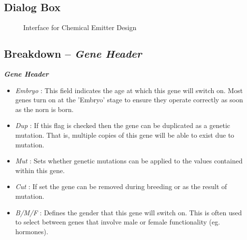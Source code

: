 \documentclass[11pt,twoside,a4paper]{article}
\begin{document}
\begin{minipage}{0.5\linewidth}
\subsection{Dialog Box}
\begin{figure}[H]
	\centerline {} %
	\caption{Interface for Chemical Emitter Design}
	\label{fig:chemical_emitter}
\end{figure}
\subsection{Breakdown -- \emph{Gene Header}}
\end{minipage}
\begin{minipage}{0.1\linewidth}\end{minipage}
\begin{minipage}{0.45\linewidth}
\textbf{\textit{Gene Header}}~\\
\begin{itemize}
	\item[] \emph{Embryo} : This field indicates the age at which this gene will switch on. Most genes turn on at the 'Embryo' stage to ensure they operate correctly as soon as the norn is born. 
	\item[] \emph{Dup} : If this flag is checked then the gene can be duplicated as a genetic mutation. That is, multiple copies of this gene will be able to exist due to mutation.
	\item[] \emph{Mut} : Sets whether genetic mutations can be applied to the values contained within this gene.
	\item[] \emph{Cut} : If set the gene can be removed during breeding or as the result of mutation. 
	\item[] \emph{B/M/F} : Defines the gender that this gene will switch on. This is often used to select between genes that involve male or female functionality (eg. hormones).
\end{itemize}
\end{minipage}~\\~\\


\end{document}
